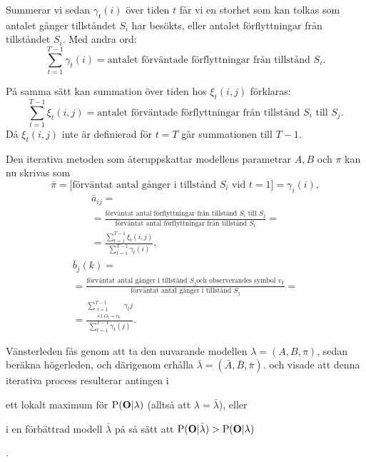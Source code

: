 \documentclass[../rapport_MVEX01-11-05]{subfiles}
\begin{document}
Summerar vi sedan $\gamma_t(i)$ över tiden $t$ får vi en storhet
som kan tolkas som antalet gånger tillståndet $S_i$ har besökts,
eller antalet förflyttningar från tillståndet $S_i$.
Med andra ord:
\begin{equation*}
\sum_{t=1}^{T-1}\gamma_t(i) = \text{antalet förväntade förflyttningar
  från tillstånd $S_i$.}
\end{equation*} 

På samma sätt kan summation över tiden hos 
$\xi_t(i,j)$ förklaras:
\begin{equation*}
\sum_{t=1}^{T-1}\xi_t(i,j) = \text{antalet förväntade förflyttningar
  från tillstånd $S_i$ till $S_j$}.
\end{equation*}
Då $\xi_t(i,j)$ inte är definierad för $t=T$ går summationen 
till $T -1$.

Den iterativa metoden som återuppskattar modellens parametrar $A,B$
och $\pi$ kan nu skrivas som
\begin{equation*}
\bar{\pi} = \text{[förväntat antal gånger i tillstånd $S_i$ vid
  $t=1$]} = \gamma_i(i),
\end{equation*}
\begin{multline*}
\bar{a}_{ij} = \\ = \frac{\text{förväntat antal förflyttningar från
    tillstånd $S_i$ till $S_j$}}{\text{förväntat antal förflyttningar
    från tillstånd $S_i$}} = \\ =
\frac{\sum_{t=1}^{T-1}\xi_t(i,j)}{\sum_{t=1}^{T-1}\gamma_t(i)},
\end{multline*}
\begin{multline*}
\bar{b}_j(k) = \\ = \frac{\text{förväntat antal gånger i tillstånd $S_j$
    och observerandes symbol $v_k$}}{\text{förväntat antal gånger i
    tillstånd $S_j$}} = \\ = \frac{\sum_{\substack{t=1\\s.t~ O_t =
      v_k}}^{T-1}\gamma_t{j}}{\sum_{t=1}^{T-1}\gamma_t(j)}.
\end{multline*}

Vänsterleden fås genom att ta den nuvarande modellen $\lambda =
(A,B,\pi)$, sedan beräkna högerleden, och därigenom erhålla $\bar{\lambda} =
(\bar{A},\bar{B}, \bar{\pi})$.  och 
visade att denna iterativa process resulterar antingen i
\begin{inparaenum}
	\item ett lokalt maximum för $\mathrm{P}(\mathbf{O}|\lambda)$
  (alltså att $\lambda = \bar{\lambda}$), eller
 	\item i en förbättrad modell $\bar{\lambda}$ på så sätt att
  $\mathrm{P}(\mathbf{O}|\bar{\lambda}) > \mathrm{P}(\mathbf{O}|\lambda)$
\end{inparaenum}. 
\end{document}
